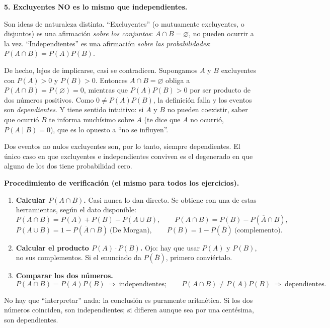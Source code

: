 \documentclass[11pt]{article}
\begin{document}
\begin{teo}
\medskip
\textbf{5. Excluyentes NO es lo mismo que independientes.}

Son ideas de naturaleza distinta. ``Excluyentes'' (o mutuamente excluyentes, o disjuntos) es
una afirmación \emph{sobre los conjuntos}: $A\cap B=\varnothing$, no pueden ocurrir a la vez.
``Independientes'' es una afirmación \emph{sobre las probabilidades}: $P(A\cap B)=P(A)P(B)$.

De hecho, lejos de implicarse, casi se contradicen. Supongamos $A$ y $B$ excluyentes con
$P(A)>0$ y $P(B)>0$. Entonces $A\cap B=\varnothing$ obliga a $P(A\cap B)=P(\varnothing)=0$,
mientras que $P(A)P(B)>0$ por ser producto de dos números positivos. Como
$0\neq P(A)P(B)$, la definición falla y los eventos son \emph{dependientes}. Y tiene sentido
intuitivo: si $A$ y $B$ no pueden coexistir, saber que ocurrió $B$ te informa muchísimo sobre
$A$ (te dice que $A$ no ocurrió, $P(A\mid B)=0$), que es lo opuesto a ``no se influyen''.

Dos eventos no nulos excluyentes son, por lo tanto, siempre dependientes. El único caso en
que excluyentes e independientes conviven es el degenerado en que alguno de los dos tiene
probabilidad cero.
\end{teo}

\begin{tip}
\textbf{Procedimiento de verificación (el mismo para todos los ejercicios).}

\begin{enumerate}[leftmargin=*]
  \item \textbf{Calcular $P(A\cap B)$.} Casi nunca lo dan directo. Se obtiene con una de
        estas herramientas, según el dato disponible:
        \[
        P(A\cap B)=P(A)+P(B)-P(A\cup B),\qquad
        P(A\cap B)=P(B)-P(\overline{A}\cap B),
        \]
        \[
        P(A\cup B)=1-P(\overline{A}\cap\overline{B})\ \text{(De Morgan)},\qquad
        P(B)=1-P(\overline{B})\ \text{(complemento)}.
        \]
  \item \textbf{Calcular el producto $P(A)\cdot P(B)$.} Ojo: hay que usar $P(A)$ y $P(B)$,
        no sus complementos. Si el enunciado da $P(\overline{B})$, primero conviértalo.
  \item \textbf{Comparar los dos números.}
        \[
        P(A\cap B)=P(A)P(B)\ \Rightarrow\ \text{independientes};\qquad
        P(A\cap B)\neq P(A)P(B)\ \Rightarrow\ \text{dependientes}.
        \]
\end{enumerate}
No hay que ``interpretar'' nada: la conclusión es puramente aritmética. Si los dos números
coinciden, son independientes; si difieren aunque sea por una centésima, son dependientes.
\end{tip}
\end{document}
